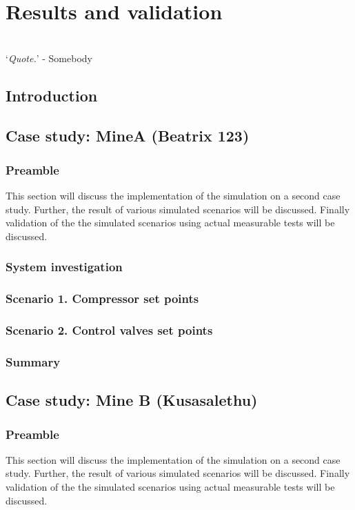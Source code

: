 \chapter{Results and validation}
\thispagestyle{empty}
\vspace{38em}
\hrulefill
\\
\enquote*{\textit{Quote.}} - Somebody\\
\newpage
\section{Introduction}

\section{Case study: MineA \color{blue}(Beatrix 123)}
	\subsection{Preamble}
This section will discuss the implementation of the simulation on a second case study. Further, the result of various simulated scenarios will be discussed. Finally validation of the the simulated scenarios using actual measurable tests will be discussed.
\subsection{System investigation}
\subsection{Scenario 1. Compressor set points}
\subsection{Scenario 2. Control valves set points}
\subsection{Summary}

\section{Case study: Mine B \color{blue}(Kusasalethu)}
	\subsection{Preamble}
	 This section will discuss the implementation of the simulation on a second case study. Further, the result of various simulated scenarios will be discussed. Finally validation of the the simulated scenarios using actual measurable tests will be discussed.
